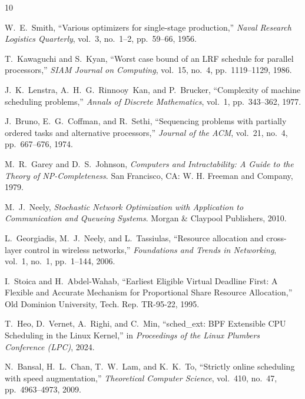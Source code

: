 \documentclass[conference]{IEEEtran}
\begin{document}
\begin{thebibliography}{10}

W.~E.~Smith, ``Various optimizers for single-stage production,'' \emph{Naval Research Logistics Quarterly}, vol.~3, no.~1--2, pp.~59--66, 1956.

T.~Kawaguchi and S.~Kyan, ``Worst case bound of an {LRF} schedule for parallel processors,'' \emph{SIAM Journal on Computing}, vol.~15, no.~4, pp.~1119--1129, 1986.

J.~K.~Lenstra, A.~H.~G.~Rinnooy~Kan, and P.~Brucker, ``Complexity of machine scheduling problems,'' \emph{Annals of Discrete Mathematics}, vol.~1, pp.~343--362, 1977.

J.~Bruno, E.~G.~Coffman, and R.~Sethi, ``Sequencing problems with partially ordered tasks and alternative processors,'' \emph{Journal of the ACM}, vol.~21, no.~4, pp.~667--676, 1974.

M.~R.~Garey and D.~S.~Johnson, \emph{Computers and Intractability: A Guide to the Theory of {NP}-Completeness}. San Francisco, CA: W. H. Freeman and Company, 1979.

M.~J.~Neely, \emph{Stochastic Network Optimization with Application to Communication and Queueing Systems}. Morgan \& Claypool Publishers, 2010.

L.~Georgiadis, M.~J.~Neely, and L.~Tassiulas, ``Resource allocation and cross-layer control in wireless networks,'' \emph{Foundations and Trends in Networking}, vol.~1, no.~1, pp.~1--144, 2006.

I.~Stoica and H.~Abdel-Wahab, ``Earliest Eligible Virtual Deadline First: A Flexible and Accurate Mechanism for Proportional Share Resource Allocation,'' Old Dominion University, Tech. Rep. TR-95-22, 1995.

T.~Heo, D.~Vernet, A.~Righi, and C.~Min, ``sched\_ext: BPF Extensible {CPU} Scheduling in the {Linux} Kernel,'' in \emph{Proceedings of the Linux Plumbers Conference (LPC)}, 2024.

N.~Bansal, H.~L.~Chan, T.~W.~Lam, and K.~K.~To, ``Strictly online scheduling with speed augmentation,'' \emph{Theoretical Computer Science}, vol.~410, no.~47, pp.~4963--4973, 2009.

\end{thebibliography}
\end{document}
